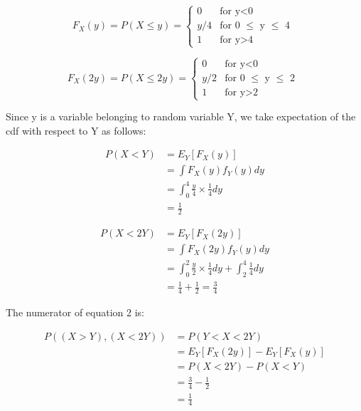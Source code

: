 \documentclass{article}
\begin{document}
\begin{equation}
  F_X(y) =P(X \leq y)=
    \begin{cases}
      0 & \text{for y$<$0}\\
      y/4 & \text{for 0 $\leq$ y $\leq$ 4 }\\
      1 & \text{for y$>$4}
    \end{cases}       
\end{equation}


\begin{equation}
  F_X(2y) =P(X \leq 2y)=
    \begin{cases}
      0 & \text{for y$<$0}\\
      y/2 & \text{for 0 $\leq$ y $\leq$ 2 }\\
      1 & \text{for y$>$2}
    \end{cases}       
\end{equation}

Since y is a variable belonging to random variable Y, we take expectation of the cdf with respect to Y as follows:

\begin{equation} 
\begin{split}
P(X < Y) & = E_Y[F_X(y)] \\
 & = \int F_X(y) f_Y(y) dy \\
 & = \int_{0}^{4} \frac{y}{4} \times \frac{1}{4} dy \\
 & = \frac{1}{2} 
\end{split}
\end{equation}

\begin{equation} 
\begin{split}
P(X < 2Y) & = E_Y[F_X(2y)] \\
 & = \int F_X(2y) f_Y(y) dy \\
 & = \int_{0}^{2} \frac{y}{2} \times \frac{1}{4} dy + \int_{2}^{4} \frac{1}{4} dy \\
 & = \frac{1}{4} + \frac{1}{2} = \frac{3}{4}
\end{split}
\end{equation}

The numerator of equation 2 is:

\begin{equation} 
\begin{split}
P ((X>Y), (X<2Y)) & = P(Y<X<2Y) \\
 & = E_Y[F_X(2y)] - E_Y[F_X(y)] \\
 & = P(X<2Y) - P(X<Y) \\
 & = \frac{3}{4} - \frac{1}{2} \\
 & = \frac{1}{4}
\end{split}
\end{equation}
\end{document}
